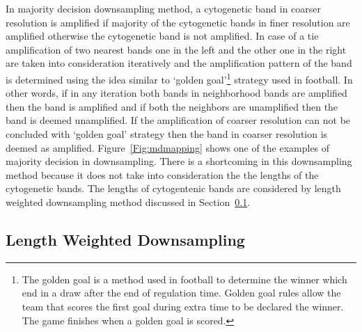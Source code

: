 In majority decision downsampling method, a cytogenetic band in coarser resolution is amplified if majority of the cytogenetic bands in finer resolution are amplified otherwise the cytogenetic band is not amplified. In case of a tie amplification of two nearest bands one in the left and the other one in the right are taken into consideration iteratively and the amplification pattern of the band is determined using the idea similar to `golden goal'\footnote{The golden goal is a method used in football to determine the winner which end in a draw after the end of regulation time. Golden goal rules allow the team that scores the first goal during extra time to be declared the winner. The game finishes when a golden goal is scored.} strategy used in football. In other words, if in any iteration both bands in neighborhood bands are amplified then the band is amplified and if both the neighbors are unamplified then the band is deemed unamplified. If the amplification of coarser resolution can not be concluded with `golden goal' strategy then the band in coarser resolution is deemed as amplified. Figure~\ref{Fig:mdmapping} shows one of the examples of majority decision in downsampling. There is a shortcoming in this downsampling method because it does not take into consideration the the lengths of the cytogenetic bands. The lengths of cytogentenic bands are considered by length weighted downsampling method discussed in Section~\ref{ss:weighted}.

\subsection{Length Weighted Downsampling}
\label{ss:weighted}

